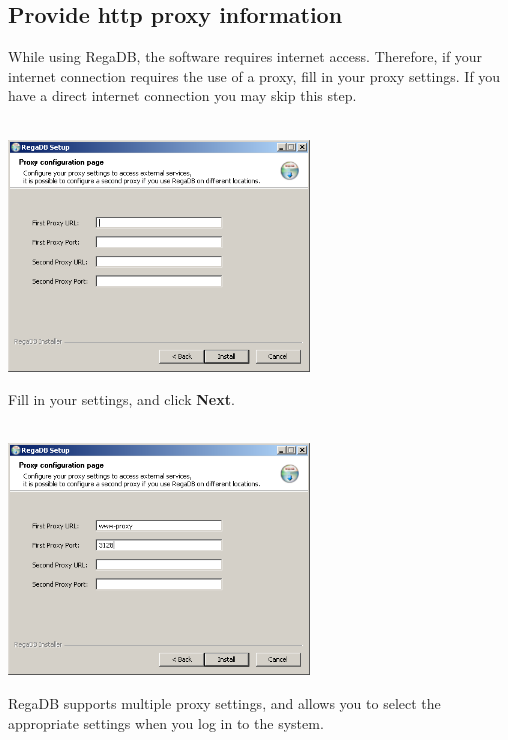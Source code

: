 \subsection{Provide http proxy information}
While using RegaDB, the software requires internet access. Therefore, if your internet connection requires the use of a proxy, fill in your proxy settings. If you have a direct internet connection you may skip this step.
\\
\vspace{0.5cm}~ \\ \centerline{\includegraphics[width=8cm] {pics/nsis/select_proxy_7.png}}
Fill in your settings, and click \textbf{Next}. 
\\
\vspace{0.5cm}~ \\ \centerline{\includegraphics[width=8cm] {pics/nsis/select_proxy_8.png}}
RegaDB supports multiple proxy settings, and allows you to select the appropriate settings when you log in to the system.

